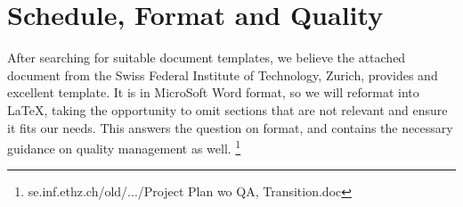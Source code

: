 \documentclass{article}
\begin{document}
\begin{comment}
Legible - The code (the code itself, not comments) should clearly state the intent. If the reader can not make sense of the code, than all other efforts are doomed to frustration if not outright failure.

Testable - The code should be organized in a way that facilitates unit testing. That supports all subsequent efforts (refactoring for modification, correction of defects, revision due to changed specs, etc.)

Flexible - Dependencies, both on other code in the code base and arbitrary implementation choices, should be minimized. Hard-coded assumptions about data size, concrete classes or data structures, etc. make the code more brittle, and therefore harder to reuse or adapt.

Compliant - The code should comply with its requirements, functional and otherwise. (I don't state this as "correct" because the discussion about whether the requirements themselves were the "right" requirements is about the process or the environment, not about the code.)

Economical - The code should make reasonable use of system resources: memory, CPU, etc. (I don't state this as "efficient" because that word is too often misused, by limiting it to a single aspect, such as speed. Economy is simply about return on investment, and requires thought about all the resources being invested and all the measures of return.)

The point of insisting that these be considered in order is that each property supports the ones that follow. For example, defects (failure to comply with specs) in code which is legible, testable, and flexible can probably be corrected with reasonable effort. On the other hand, I suspect that every programmer has had experience with code which was micro-optimized for performance to the point that it was too brittle for reasonable maintenance.

\end{comment}


\newpage
\section{Schedule, Format and Quality}
After searching for suitable document templates, we believe the attached document from the Swiss Federal Institute of Technology, Zurich, provides and excellent template. It is in MicroSoft Word format, so we will reformat into LaTeX, taking the opportunity to omit sections that are not relevant and ensure it fits our needs. This answers the question on format, and contains the necessary guidance on quality management as well. \footnote{se.inf.ethz.ch/old/.../Project Plan wo QA, Transition.doc}
\end{document}
